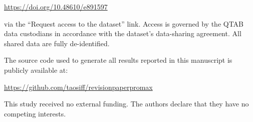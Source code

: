 \documentclass[10pt,letterpaper]{article}
\begin{document}
\begin{center}
\url{https://doi.org/10.48610/e891597}
\end{center}

via the ``Request access to the dataset'' link. Access is governed by the QTAB data custodians in accordance with the dataset's data-sharing agreement. All shared data are fully de-identified.

The source code used to generate all results reported in this manuscript is publicly available at:

\begin{center}
\url{https://github.com/taosiff/revisionpaperpromax}
\end{center}

This study received no external funding. The authors declare that they have no competing interests.
                                                                                                                                                                          
\end{document}
